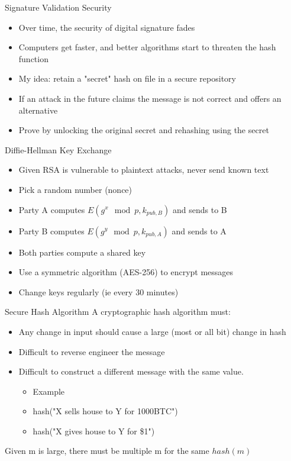 \begin{withoutheadline}
\begin{frame}{Signature Validation Security}
    \begin{itemize}
        \item Over time, the security of digital signature fades
        \item Computers get faster, and better algorithms start to threaten the hash function
        \item My idea: retain a "secret" hash on file in a secure repository
        \item If an attack in the future claims the message is not correct and offers an alternative
        \item Prove by unlocking the original secret and rehashing using the secret
    \end{itemize}
\end{frame}

\begin{frame}{Diffie-Hellman Key Exchange}
    \begin{itemize}
        \item Given RSA is vulnerable to plaintext attacks, never send known text
        \item Pick a random number (nonce)
        \item Party A computes $E(g^x \mod p, k_{pub,B})$ and sends to B
        \item Party B computes $E(g^y \mod p, k_{pub,A})$ and sends to A
        \item Both parties compute a shared key
        \item Use a symmetric algorithm (AES-256) to encrypt messages
        \item Change keys regularly (ie every 30 minutes)
    \end{itemize}
\end{frame}

\begin{frame}{Secure Hash Algorithm}
    A cryptographic hash algorithm must:
    \begin{itemize}
        \item Any change in input should cause a large (most or all bit) change in hash
        \item Difficult to reverse engineer the message
        \item Difficult to construct a different message with the same value.
        \begin{itemize}
            \item Example
            \item hash("X sells house to Y for 1000BTC") %
            \item hash("X gives house to Y for \$1")     %
        \end{itemize}
    \end{itemize}
    Given m is large, there must be multiple m for the same $hash(m)$
\end{frame}


\end{withoutheadline}
